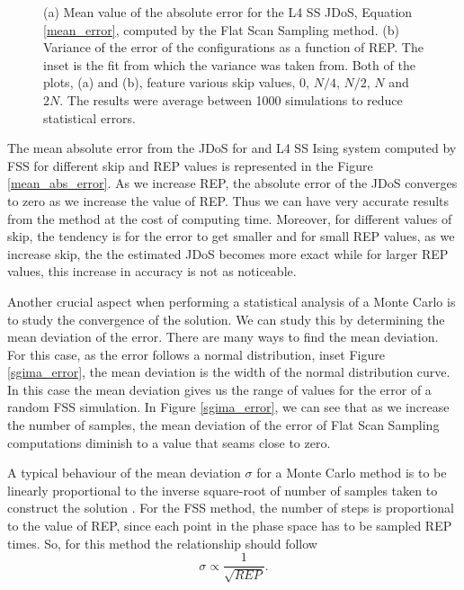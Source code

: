 \begin{figure}[h]
	\centering
	\caption{(a) Mean value of the absolute error for the L4 SS JDoS, Equation \ref{mean_error}, computed by the Flat Scan Sampling method. (b) Variance of the error of the configurations as a function of REP. The inset is the fit from which the variance was taken from. Both of the plots, (a) and (b), feature various skip values, $0$, $N/4$, $N/2$, $N$ and $2N$. The results were average between 1000 simulations to reduce statistical errors.}
\end{figure}

	The mean absolute error from the JDoS for and L4 SS Ising system computed by FSS for different skip and REP values is represented in the Figure \ref{mean_abs_error}. As we increase REP, the absolute error of the JDoS converges to zero as we increase the value of REP. Thus we can have very accurate results from the method at the cost of computing time. 
Moreover, for different values of skip, the tendency is for the error to get smaller and for small REP values, as we increase skip, the the estimated JDoS becomes more exact while for larger REP values, this increase in accuracy is not as noticeable.

	Another crucial aspect when performing a statistical analysis of a Monte Carlo is to study the convergence of the solution. We can study this by determining the mean deviation of the error. There are many ways to find the mean deviation. For this case, as the error follows a normal distribution, inset Figure \ref{sgima_error}, the mean deviation is the width of the normal distribution curve. In this case the mean deviation gives us the range of values for the error of a random FSS simulation. In Figure \ref{sgima_error}, we can see that as we increase the number of samples, the mean  deviation of the error of Flat Scan Sampling computations diminish to a value that seams close to zero.
	
	A typical behaviour of the mean deviation $\sigma$ for a Monte Carlo method is to be linearly proportional to the inverse square-root of number of samples taken to construct the solution \cite{Landau_Book}. For the FSS method, the number of steps is proportional to the value of REP, since each point in the phase space has to be sampled REP times. So, for this method the relationship should follow 
\begin{equation}\label{standard_mc}
	\sigma \propto \frac{1}{\sqrt{REP}}.
\end{equation}

